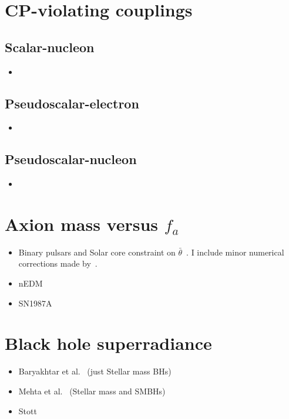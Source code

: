 \documentclass[10pt,twocolumn]{article}
\begin{document}
\section{CP-violating couplings}
\subsection*{Scalar-nucleon}
\begin{itemize}\setlength\itemsep{-0.5em}
	\item 
\end{itemize}
\vspace{-2em}

\subsection*{Pseudoscalar-electron}
\begin{itemize}\setlength\itemsep{-0.5em}
	\item 
\end{itemize}
\vspace{-2em}

\subsection*{Pseudoscalar-nucleon}
\begin{itemize}\setlength\itemsep{-0.5em}
	\item 
\end{itemize}


\section{Axion mass versus $f_a$}
\begin{itemize}\setlength\itemsep{-0.5em}
	\item Binary pulsars and Solar core constraint on $\bar{\theta}$~\cite{Hook:2017psm}. I include minor numerical corrections made by~\cite{DiLuzio:2021gos,DiLuzio:2021pxd}.
	\item nEDM~\cite{Chang:2017ruk}
	\item SN1987A~\cite{Raffelt:2006cw}
\end{itemize}



\section{Black hole superradiance}
\begin{itemize}\setlength\itemsep{-0.5em}
	\item Baryakhtar et al.~\cite{Baryakhtar:2020gao} (just Stellar mass BHs)
	\item Mehta et al.~\cite{Baryakhtar:2020gao} (Stellar mass and SMBHs)
	\item Stott~\cite{Stott:2020gjj}
\end{itemize}



\end{document}
